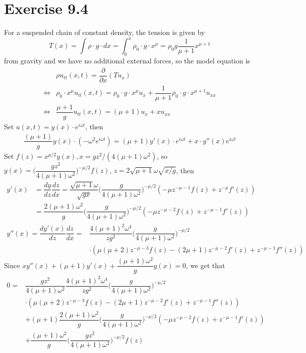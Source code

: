 \documentclass[a4paper,12pt,titlepage]{article}
\begin{document}
\section*{Exercise 9.4}
For a suspended chain of constant density, the tension is given by
$$T(x) =\int\rho\cdot g \cdot dx=\int_0^x\rho_0\cdot g\cdot x^{\mu}=\rho_0g\dfrac{1}{\mu+1}x^{\mu+1}$$
from gravity and we have no additional external forces, so the model equation is
\begin{align*}
&\rho u_{tt}(x,t)=\dfrac{\partial}{\partial x}(Tu_x)\\
\Leftrightarrow &\rho_0\cdot x^{\mu}u_{tt}(x,t)=\rho_0\cdot g\cdot x^{\mu}u_{x}+\dfrac{1}{\mu+1}\rho_0\cdot g\cdot x^{\mu+1}u_{xx}\\
\Leftrightarrow &\dfrac{\mu+1}{g}u_{tt}(x,t)=(\mu+1)u_x+xu_{xx}
\end{align*}
Set $u(x,t)=y(x)\cdot e^{i\omega t}$, then
\begin{align*}
\dfrac{(\mu+1)}{g}y(x)\cdot(-\omega^2e^{i\omega t})=(\mu+1)y'(x)\cdot e^{i\omega t}+x\cdot y''(x)e^{i\omega t}
\end{align*}
Set $f(z)=x^{\mu/2}y(x),x=gz^2/(4(\mu+1)\omega^2)$, so $y(x)=\Big(\dfrac{gz^2}{4(\mu+1)\omega^2}\Big)^{-\mu/2}f(z)$, $z=2\sqrt{\mu+1}\omega\sqrt{x/g}$, then
\begin{align*}
y'(x)&=\dfrac{dy}{dz}\dfrac{dz}{dx}=\dfrac{\sqrt{\mu+1}\omega}{\sqrt{gx}}\Big(\dfrac{g}{4(\mu+1)\omega^2}\Big)^{-\mu/2}(-\mu z^{-\mu-1}f(z)+z^{-\mu}f'(z))\\
&=\dfrac{2(\mu+1)\omega^2}{g}\Big(\dfrac{g}{4(\mu+1)\omega^2}\Big)^{-\mu/2}(-\mu z^{-\mu-2}f(z)+z^{-\mu-1}f'(z))
\end{align*}
\begin{align*}
y''(x)=\dfrac{dy'(x)}{dz}\dfrac{dz}{dx}=&\dfrac{4(\mu+1)^2\omega^4}{zg^2}\Big(\dfrac{g}{4(\mu+1)\omega^2}\Big)^{-\mu/2}\\
&\cdot(\mu(\mu+2)z^{-\mu-3}f(z)-(2\mu+1)z^{-\mu-2}f'(z)+z^{-\mu-1}f''(z))
\end{align*}
Since $xy''(x)+(\mu+1)y'(x)+\dfrac{(\mu+1)\omega^2}{g}y(x)=0$, we get that
\begin{align*}
0=&\dfrac{gz^2}{4(\mu+1)\omega^2}\dfrac{4(\mu+1)^2\omega^4}{zg^2}\Big(\dfrac{g}{4(\mu+1)\omega^2}\Big)^{-\mu/2}\\
&\cdot(\mu(\mu+2)z^{-\mu-3}f(z)-(2\mu+1)z^{-\mu-2}f'(z)+z^{-\mu-1}f''(z))\\
&+(\mu+1)\dfrac{2(\mu+1)\omega^2}{g}\Big(\dfrac{g}{4(\mu+1)\omega^2}\Big)^{-\mu/2}(-\mu z^{-\mu-2}f(z)+z^{-\mu-1}f'(z))\\
&+\dfrac{(\mu+1)\omega^2}{g}\Big(\dfrac{gz^2}{4(\mu+1)\omega^2}\Big)^{-\mu/2}f(z)
\end{align*}
\end{document}
